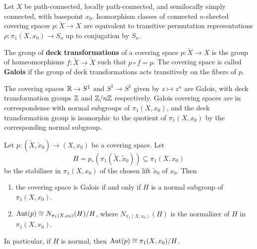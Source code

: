 \documentclass[12pt]{article}
\begin{document}
\begin{theorem}
    Let $X$ be path-connected, locally path-connected, and semilocally simply connected, with basepoint $x_0$. Isomorphism classes of connected $n$-sheeted covering spaces $p:\widetilde X\to X$ are equivalent to transitive permutation representations $\rho:\pi_1(X,x_0)\to S_n$ up to conjugation by $S_n$.
\end{theorem}

\begin{definition}
    The group of \textbf{deck transformations} of a covering space $p:\widetilde X\to X$ is the group of homeomorphisms $f:\widetilde X\to \widetilde X$ such that $p\circ f=p$. The covering space is called \textbf{Galois} if the group of deck transformations acts transitively on the fibers of $p$.
\end{definition}

The covering spaces $\mathbb{R}\to S^1$ and $S^1 \to S^1$ given by $z\mapsto z^n$ are Galois, with deck transformation groups $\mathbb{Z}$ and $\mathbb{Z}/n\mathbb{Z}$ respectively. Galois covering spaces are in correspondense with normal subgroups of $\pi_1(X,x_0)$, and the deck transformation group is isomorphic to the quotient of $\pi_1(X,x_0)$ by the corresponding normal subgroup.

\begin{proposition}
    Let $p:(\tilde X,\tilde x_0)\to (X,x_0)$ be a covering space. Let \[H=p_*(\pi_1(\tilde X,\tilde x_0))\subseteq \pi_1(X,x_0)\] be the stabilizer in $\pi_1(X,x_0)$ of the chosen lift $\tilde x_0$ of $x_0$.
    Then \begin{enumerate}
        \item the covering space is Galois if and only if $H$ is a normal subgroup of $\pi_1(X,x_0)$.
        \item $\operatorname{Aut}(p)\cong N_{\pi_1(X,x_0)}(H)/H$, where $N_{\pi_1(X,x_0)}(H)$ is the normalizer of $H$ in $\pi_1(X,x_0)$.
    \end{enumerate}
    In particular, if $H$ is normal, then $\operatorname{Aut}(p)\cong \pi_1(X,x_0)/H$.
\end{proposition}
\end{document}
